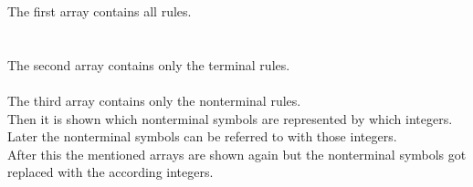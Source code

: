 \documentclass[a4paper, 11pt]{article}
\begin{document}
\begin{minipage}{0.6\textwidth}
\vspace*{-2em}
The first array contains all rules. \\ \\ \\

The second array contains only the terminal rules. \\ \\

The third array contains only the nonterminal rules. \\

Then it is shown which nonterminal symbols are represented by which integers. Later the nonterminal symbols can be referred to with those integers. \\ 

After this the mentioned arrays are shown again but the nonterminal symbols got replaced with the according integers.


\end{minipage}
\end{document}
